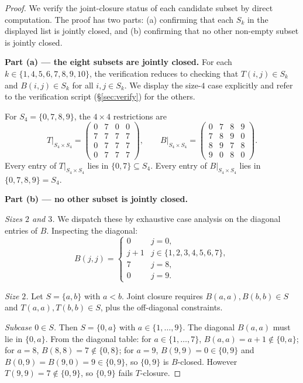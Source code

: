 \documentclass[11pt,reqno]{amsart}
\theoremstyle{plain}
\theoremstyle{definition}
\theoremstyle{remark}
\begin{document}
\begin{proof}
We verify the joint-closure status of each candidate subset by
direct computation. The proof has two parts: (a) confirming that
each $S_{k}$ in the displayed list is jointly closed, and (b)
confirming that no other non-empty subset is jointly closed.

\textbf{Part (a) — the eight subsets are jointly closed.} For
each $k\in\{1,4,5,6,7,8,9,10\}$, the verification reduces to
checking that $T(i,j)\in S_{k}$ and $B(i,j)\in S_{k}$ for all
$i,j\in S_{k}$. We display the size-$4$ case explicitly and refer
to the verification script (\S\ref{sec:verify}) for the others.

For $S_{4}=\{0,7,8,9\}$, the $4\times 4$ restrictions are
\[
T\big|_{S_{4}\times S_{4}}=\begin{pmatrix}
0 & 7 & 0 & 0 \\
7 & 7 & 7 & 7 \\
0 & 7 & 7 & 7 \\
0 & 7 & 7 & 7
\end{pmatrix},
\qquad
B\big|_{S_{4}\times S_{4}}=\begin{pmatrix}
0 & 7 & 8 & 9 \\
7 & 8 & 9 & 0 \\
8 & 9 & 7 & 8 \\
9 & 0 & 8 & 0
\end{pmatrix}.
\]
Every entry of $T\big|_{S_{4}\times S_{4}}$ lies in
$\{0,7\}\subseteq S_{4}$. Every entry of
$B\big|_{S_{4}\times S_{4}}$ lies in $\{0,7,8,9\}=S_{4}$.

\textbf{Part (b) — no other subset is jointly closed.}

\emph{Sizes $2$ and $3$.} We dispatch these by exhaustive case
analysis on the diagonal entries of $B$. Inspecting the diagonal:
\[
B(j,j)=\begin{cases}
0 & j=0,\\
j+1 & j\in\{1,2,3,4,5,6,7\},\\
7 & j=8,\\
0 & j=9.
\end{cases}
\]

\emph{Size $2$.} Let $S=\{a,b\}$ with $a<b$. Joint closure requires
$B(a,a),B(b,b)\in S$ and $T(a,a),T(b,b)\in S$, plus the off-diagonal
constraints.

\emph{Subcase $0\in S$.} Then $S=\{0,a\}$ with $a\in\{1,\dots,9\}$.
The diagonal $B(a,a)$ must lie in $\{0,a\}$. From the diagonal
table: for $a\in\{1,\dots,7\}$, $B(a,a)=a+1\notin\{0,a\}$; for
$a=8$, $B(8,8)=7\notin\{0,8\}$; for $a=9$, $B(9,9)=0\in\{0,9\}$ and
$B(0,9)=B(9,0)=9\in\{0,9\}$, so $\{0,9\}$ is $B$-closed. However
$T(9,9)=7\notin\{0,9\}$, so $\{0,9\}$ fails $T$-closure.


\end{proof}
\end{document}
